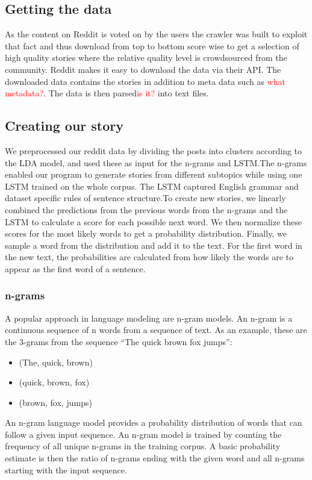 \documentclass[12pt,a4paper,utf8]{article}
\newcommand\todonote[1]{\textcolor{red}{#1}}
\begin{document}
\subsection{Getting the data}
As the content on Reddit is voted on by the users the crawler was built to exploit that fact and thus download from top to bottom score wise to get a selection of high quality stories where the relative quality level is crowdsourced from the community. Reddit makes it easy to download the data via their API\autocite{redditAPI}. The downloaded data contains the stories in addition to meta data such as \todonote{what metadata?}. The data is then parsed\todonote{is it?} into text files.

\subsection{Creating our story}
We preprocessed our reddit data by dividing the posts into clusters according to the LDA model, and used these as input for the n-grams and LSTM.The n-grams enabled our program to generate stories from different subtopics while using one LSTM trained on the whole corpus. The LSTM captured English grammar and dataset specific rules of sentence structure.To create new stories, we linearly combined the predictions from the previous words from the n-grams and the LSTM to calculate a score for each possible next word. We then normalize these scores for the most likely words to get a probability distribution. Finally, we sample a word from the distribution and add it to the text. For the first word in the new text, the probabilities are calculated from how likely the words are to appear as the first word of a sentence.

\subsubsection{n-grams}
A popular approach in language modeling are n-gram models. An n-gram is a continuous sequence of n words from a sequence of text. As an example, these are the 3-grams from the sequence “The quick brown fox jumps”:

\begin{itemize}
\item (The, quick, brown)
\item (quick, brown, fox)
\item (brown, fox, jumps)
\end{itemize}

An n-gram language model provides a probability distribution of words that can follow a given input sequence. An n-gram model is trained by counting the frequency of all unique n-grams in the training corpus. A basic probability estimate is then the ratio of n-grams ending with the given word and all n-grams starting with the input sequence. 
\end{document}
